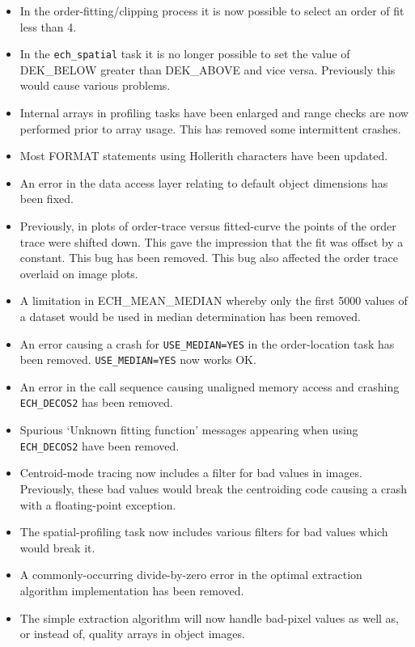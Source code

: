 \documentclass[11pt,twoside]{article}
\newcommand{\htmlref}[2]{#1}
\begin{document}
\begin{itemize}
\item In the order-fitting/clipping process it is now possible to
   select an order of fit less than 4.
\item In the {\tt ech\_spatial} task it is no longer possible to set the
   value of DEK\_BELOW greater than DEK\_ABOVE and vice versa.
   Previously this would cause various problems.
\item Internal arrays in profiling tasks have been enlarged and
   range checks are now performed prior to array usage.  This
   has removed some intermittent crashes.
\item Most FORMAT statements using Hollerith characters have been updated.
\item An error in the data access layer relating to default object
   dimensions has been fixed.
\item Previously, in plots of order-trace versus fitted-curve the points
   of the order trace were shifted down.  This gave the impression that
   the fit was offset by a constant.  This bug has been removed.
   This bug also affected the order trace overlaid on image plots.
\item A limitation in ECH\_MEAN\_MEDIAN whereby only the first 5000 values of
   a dataset would be used in median determination has been removed.
\item An error causing a crash for
   \htmlref{{\tt{USE\_MEDIAN=YES}}}{par_USE_MEDIAN} in the order-location
   task has been removed.  {\tt USE\_MEDIAN=YES} now works OK.
\item An error in the call sequence causing unaligned memory access and
   crashing {\tt ECH\_DECOS2} has been removed.
\item Spurious `Unknown fitting function' messages appearing when using
   {\tt ECH\_DECOS2} have been removed.
\item Centroid-mode tracing now includes a filter for bad values in images.
   Previously, these bad values would break the centroiding code causing
   a crash with a floating-point exception.
\item The spatial-profiling task now includes various filters for bad
   values which would break it.
\item A commonly-occurring divide-by-zero error in the optimal extraction
   algorithm implementation has been removed.
\item The simple extraction algorithm will now handle bad-pixel values as
   well as, or instead of, quality arrays in object images.

\end{itemize}
\end{document}
